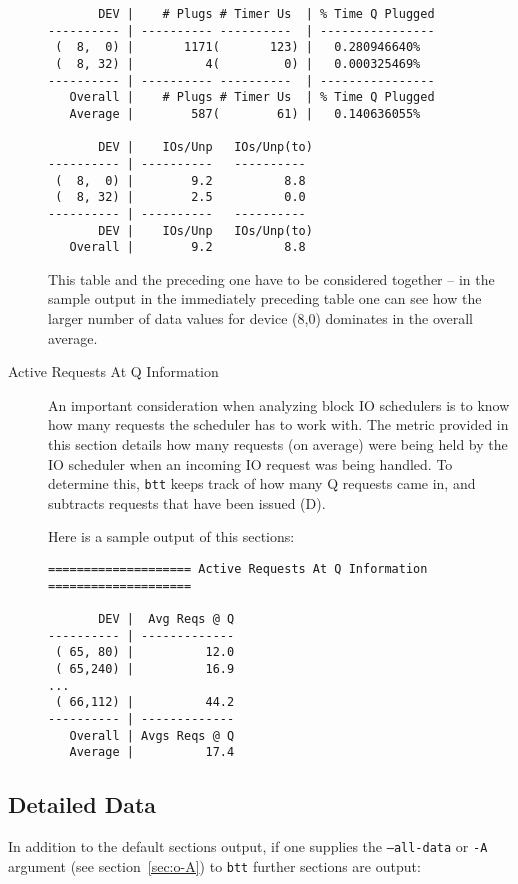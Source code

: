 \documentclass{article}
\begin{document}
\begin{description}
\begin{verbatim}
       DEV |    # Plugs # Timer Us  | % Time Q Plugged
---------- | ---------- ----------  | ----------------
 (  8,  0) |       1171(       123) |   0.280946640%
 (  8, 32) |          4(         0) |   0.000325469%
---------- | ---------- ----------  | ----------------
   Overall |    # Plugs # Timer Us  | % Time Q Plugged
   Average |        587(        61) |   0.140636055%

       DEV |    IOs/Unp   IOs/Unp(to)
---------- | ----------   ----------
 (  8,  0) |        9.2          8.8
 (  8, 32) |        2.5          0.0
---------- | ----------   ----------
       DEV |    IOs/Unp   IOs/Unp(to)
   Overall |        9.2          8.8
\end{verbatim}

  This table and the preceding one have to be considered together --
  in the sample output in the immediately preceding table one can see
  how the larger number of data values for device (8,0) dominates in
  the overall average.

  \item[Active Requests At Q Information]

  An important consideration when analyzing block IO schedulers is to
  know how many requests the scheduler has to work with. The metric
  provided in this section details how many requests (on average) were
  being held by the IO scheduler when an incoming IO request was being
  handled. To determine this, \texttt{btt} keeps track of how many Q
  requests came in, and subtracts requests that have been issued (D).

  Here is a sample output of this sections:

\begin{verbatim}
==================== Active Requests At Q Information ====================

       DEV |  Avg Reqs @ Q
---------- | -------------
 ( 65, 80) |          12.0
 ( 65,240) |          16.9
...
 ( 66,112) |          44.2
---------- | -------------
   Overall | Avgs Reqs @ Q
   Average |          17.4
\end{verbatim}

\end{description}

\newpage
\subsection*{\label{sec:detailed-data}Detailed Data}

  In addition to the default sections output, if one supplies the
  \texttt{--all-data} or \texttt{-A} argument (see section~\ref{sec:o-A})
  to \texttt{btt} further sections are output:
\end{document}
